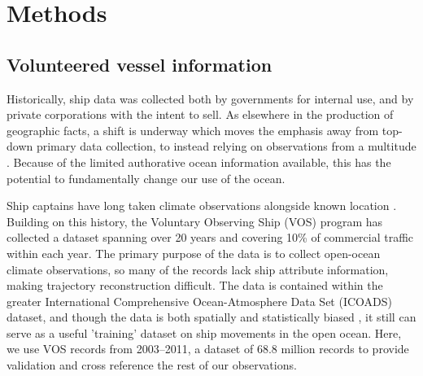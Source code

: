 \section{\textbf{Methods}}



\subsection{Volunteered vessel information}


Historically, ship data was collected both by governments for internal use, and by private corporations with the intent to sell. As elsewhere in the production of geographic facts, a shift is underway which moves the emphasis away from top-down primary data collection, to instead relying on observations from a multitude \citep{goodchild1999cartographic,goodchild2007citizens,elwood2011researching}. Because of the limited authorative ocean information available, this has the potential to fundamentally change our use of the ocean.

Ship captains have long taken climate observations alongside known location \cite{brohan2009marine}.  Building on this history, the Voluntary Observing Ship (VOS) \citep{VOSOverview} program has collected a dataset spanning over 20 years and covering 10\% of commercial traffic within each year. The primary purpose of the data is to collect open-ocean climate observations, so many of the records lack ship attribute information, making trajectory reconstruction difficult. The data is contained within the greater International Comprehensive Ocean-Atmosphere Data Set (ICOADS) dataset, and though the data is both spatially and statistically biased \citep{Wang2007}, it still can serve as a useful 'training' dataset on ship movements in the open ocean. Here, we use VOS records from 2003--2011, a dataset of 68.8 %
million records to provide validation and cross reference the rest of our observations.

